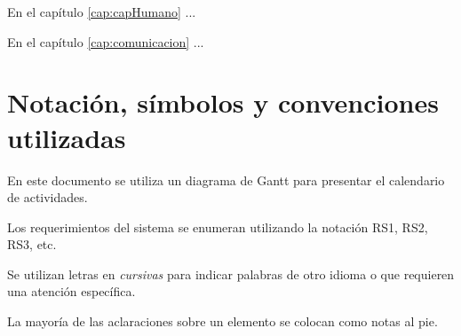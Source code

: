 	En el capítulo \ref{cap:capHumano} ...
	
	En el capítulo \ref{cap:comunicacion} ...

\section{Notación, símbolos y convenciones utilizadas}

	En este documento se utiliza un diagrama de Gantt para presentar el calendario de actividades.
	
	Los requerimientos del sistema se enumeran utilizando la notación RS1, RS2, RS3, etc.
	
	Se utilizan letras en {\em cursivas} para indicar palabras de otro idioma o que requieren una atención específica. 
	
	La mayoría de las aclaraciones sobre un elemento se colocan como notas al pie.

